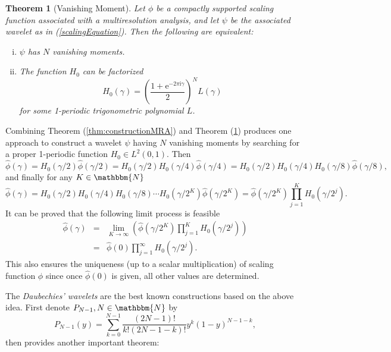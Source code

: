 \documentclass{book}
\newcommand{\mathe}{\mathrm{e}}
\newcommand{\mathi}{\mathrm{i}}
\newcommand{\mathpi}{\pi}
\newcommand{\tmtextit}[1]{{\itshape{#1}}}
\newenvironment{enumerateroman}{\begin{enumerate}[i.] }{\end{enumerate}}
\newtheorem{theorem}{Theorem}
\begin{document}
\begin{theorem}[Vanishing Moment]
  \label{thm:vanishingMoment}Let $\phi$ be a compactly supported scaling
  function associated with a multiresolution analysis, and let $\psi$ be the
  associated wavelet as in (\ref{scalingEquation}). Then the following are
  equivalent:
  \begin{enumerateroman}
    \item $\psi$ has $N$ vanishing moments.
    
    \item The function $H_0$ can be factorized
    \begin{equation}
      H_0 (\gamma) = \left( \frac{1 + \mathe^{- 2 \mathpi \mathi \gamma}}{2}
      \right)^N L (\gamma) \label{vanishingMomentH}
    \end{equation}
    for some 1-periodic trigonometric polynomial $L$.
  \end{enumerateroman}
\end{theorem}

Combining Theorem (\ref{thm:constructionMRA}) and Theorem
(\ref{thm:vanishingMoment}) produces one approach to construct a wavelet
$\psi$ having $N$ vanishing moments by searching for a proper 1-periodic
function $H_0 \in L^2 (0, 1)$. Then
\[ \hat{\phi} (\gamma) = H_0 (\gamma / 2) \hat{\phi} (\gamma / 2) = H_0
   (\gamma / 2) H_0 (\gamma / 4) \hat{\phi} (\gamma / 4) = H_0 (\gamma / 2)
   H_0 (\gamma / 4) H_0 (\gamma / 8) \hat{\phi} (\gamma / 8), \]
and finally for any $K \in \mathbbm{N}$
\[ \hat{\phi} (\gamma) = H_0 (\gamma / 2) H_0 (\gamma / 4) H_0 (\gamma / 8)
   \cdots H_0 (\gamma / 2^K) \hat{\phi} (\gamma / 2^K) = \hat{\phi} (\gamma /
   2^K) \prod_{j = 1}^K H_0 (\gamma / 2^j) . \]
It can be proved that the following limit process is feasible
\begin{eqnarray*}
  \hat{\phi} (\gamma) & = & \lim_{K \rightarrow \infty} \left( \hat{\phi}
  (\gamma / 2^K) \prod_{j = 1}^K H_0 (\gamma / 2^j) \right)\\
  & = & \hat{\phi} (0) \prod_{j = 1}^{\infty} H_0 (\gamma / 2^j) .
\end{eqnarray*}
This also ensures the uniqueness (up to a scalar multiplication) of scaling
function $\phi$ since once $\hat{\phi} (0)$ is given, all other values are
determined.

The \tmtextit{Daubechies' wavelets} are the best known constructions based on
the above idea. First denote $P_{N - 1}, N \in \mathbbm{N}$ by
\[ P_{N - 1} (y) = \sum_{k = 0}^{N - 1} \frac{(2 N - 1) !}{k! (2 N - 1 - k) !}
   y^k (1 - y)^{N - 1 - k}, \]
then {\cite{daubechies1992ten}} provides another important theorem:
\end{document}
